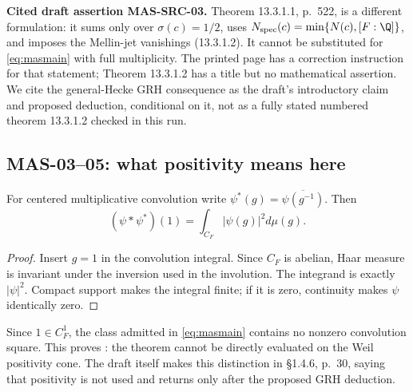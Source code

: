 \textbf{Cited draft assertion MAS-SRC-03.} Theorem 13.3.1.1, p.~522, is a different formulation: it sums only over $\sigma(c)=1/2$, uses $N_{\mathrm{spec}}(c)=\min\{N(c),[F:\Q]\}$, and imposes the Mellin-jet vanishings (13.3.1.2). It cannot be substituted for \eqref{eq:masmain} with full multiplicity. The printed page has a correction instruction for that statement; Theorem 13.3.1.2 has a title but no mathematical assertion. We cite the general-Hecke GRH consequence as the draft's introductory claim and proposed deduction, conditional on it, not as a fully stated numbered theorem 13.3.1.2 checked in this run.

\subsection{MAS-03--05: what positivity means here}
For centered multiplicative convolution write $\psi^*(g)=\overline{\psi(g^{-1})}$. Then
\begin{equation}\label{eq:squareone}
 (\psi*\psi^*)(1)=\int_{C_F}|\psi(g)|^2d\mu(g).
\end{equation}
\begin{proof}
Insert $g=1$ in the convolution integral. Since $C_F$ is abelian, Haar measure is invariant under the inversion used in the involution. The integrand is exactly $|\psi|^2$. Compact support makes the integral finite; if it is zero, continuity makes $\psi$ identically zero.
\end{proof}
Since $1\in C_F^1$, the class admitted in \eqref{eq:masmain} contains no nonzero convolution square. This proves : the theorem cannot be directly evaluated on the Weil positivity cone. The draft itself makes this distinction in \S1.4.6, p.~30, saying that positivity is not used and returns only after the proposed GRH deduction.

